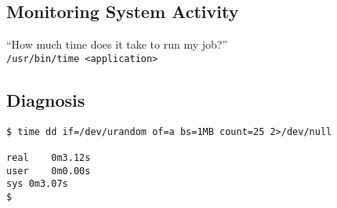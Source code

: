 \documentclass[xga]{xdvislides}
\begin{document}
\subsection{Monitoring System Activity}
\vspace{.5in}
\begin{center}
	\Huge
	``How much time does it take to run my job?'' \\
	\vspace{.5in}
	\verb+/usr/bin/time <application>+ \\
\end{center}
\Normalsize

%
%
%
%

\subsection{Diagnosis}
\begin{verbatim}
$ time dd if=/dev/urandom of=a bs=1MB count=25 2>/dev/null

real	0m3.12s
user	0m0.00s
sys	0m3.07s
$
\end{verbatim}
\end{document}
